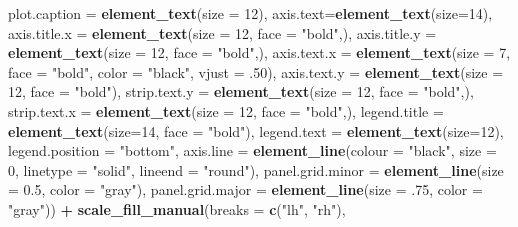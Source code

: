 \documentclass[
]{article}
\newenvironment{Shaded}{\begin{snugshade}}{\end{snugshade}}
\newcommand{\DataTypeTok}[1]{\textcolor[rgb]{0.13,0.29,0.53}{#1}}
\newcommand{\DecValTok}[1]{\textcolor[rgb]{0.00,0.00,0.81}{#1}}
\newcommand{\FloatTok}[1]{\textcolor[rgb]{0.00,0.00,0.81}{#1}}
\newcommand{\KeywordTok}[1]{\textcolor[rgb]{0.13,0.29,0.53}{\textbf{#1}}}
\newcommand{\NormalTok}[1]{#1}
\newcommand{\OperatorTok}[1]{\textcolor[rgb]{0.81,0.36,0.00}{\textbf{#1}}}
\newcommand{\StringTok}[1]{\textcolor[rgb]{0.31,0.60,0.02}{#1}}
\begin{document}
\begin{Shaded}
\begin{Highlighting}[]
{{        \DataTypeTok{plot.caption =} \KeywordTok{element_text}\NormalTok{(}\DataTypeTok{size =} \DecValTok{12}\NormalTok{),}
        \DataTypeTok{axis.text=}\KeywordTok{element_text}\NormalTok{(}\DataTypeTok{size=}\DecValTok{14}\NormalTok{),}
        \DataTypeTok{axis.title.x =} \KeywordTok{element_text}\NormalTok{(}\DataTypeTok{size =} \DecValTok{12}\NormalTok{, }\DataTypeTok{face =} \StringTok{"bold"}\NormalTok{,),}
        \DataTypeTok{axis.title.y =} \KeywordTok{element_text}\NormalTok{(}\DataTypeTok{size =} \DecValTok{12}\NormalTok{, }\DataTypeTok{face =} \StringTok{"bold"}\NormalTok{,),}
        \DataTypeTok{axis.text.x =} \KeywordTok{element_text}\NormalTok{(}\DataTypeTok{size =} \DecValTok{7}\NormalTok{, }\DataTypeTok{face =} \StringTok{"bold"}\NormalTok{, }\DataTypeTok{color =} \StringTok{"black"}\NormalTok{, }\DataTypeTok{vjust =} \FloatTok{.50}\NormalTok{),}
        \DataTypeTok{axis.text.y =} \KeywordTok{element_text}\NormalTok{(}\DataTypeTok{size =} \DecValTok{12}\NormalTok{, }\DataTypeTok{face =} \StringTok{"bold"}\NormalTok{),}
        \DataTypeTok{strip.text.y =} \KeywordTok{element_text}\NormalTok{(}\DataTypeTok{size =} \DecValTok{12}\NormalTok{, }\DataTypeTok{face =} \StringTok{"bold"}\NormalTok{,),}
        \DataTypeTok{strip.text.x =} \KeywordTok{element_text}\NormalTok{(}\DataTypeTok{size =} \DecValTok{12}\NormalTok{, }\DataTypeTok{face =} \StringTok{"bold"}\NormalTok{,),}
        \DataTypeTok{legend.title =} \KeywordTok{element_text}\NormalTok{(}\DataTypeTok{size=}\DecValTok{14}\NormalTok{, }\DataTypeTok{face =} \StringTok{"bold"}\NormalTok{), }
        \DataTypeTok{legend.text =} \KeywordTok{element_text}\NormalTok{(}\DataTypeTok{size=}\DecValTok{12}\NormalTok{),}
        \DataTypeTok{legend.position =} \StringTok{"bottom"}\NormalTok{,}
        \DataTypeTok{axis.line =} \KeywordTok{element_line}\NormalTok{(}\DataTypeTok{colour =} \StringTok{"black"}\NormalTok{, }
                                 \DataTypeTok{size =} \DecValTok{0}\NormalTok{, }\DataTypeTok{linetype =} \StringTok{"solid"}\NormalTok{, }\DataTypeTok{lineend =} \StringTok{"round"}\NormalTok{),}
        \DataTypeTok{panel.grid.minor =} \KeywordTok{element_line}\NormalTok{(}\DataTypeTok{size =} \FloatTok{0.5}\NormalTok{, }\DataTypeTok{color =} \StringTok{"gray"}\NormalTok{), }
        \DataTypeTok{panel.grid.major =} \KeywordTok{element_line}\NormalTok{(}\DataTypeTok{size =} \FloatTok{.75}\NormalTok{, }\DataTypeTok{color =} \StringTok{"gray"}\NormalTok{)) }\OperatorTok{+}
\StringTok{  }\KeywordTok{scale_fill_manual}\NormalTok{(}\DataTypeTok{breaks =} \KeywordTok{c}\NormalTok{(}\StringTok{"lh"}\NormalTok{, }\StringTok{"rh"}\NormalTok{), }
}}
\end{Highlighting}
\end{Shaded}
\end{document}
